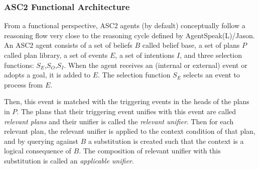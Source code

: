 \subsubsection*{ASC2 Functional Architecture}
From a functional perspective, ASC2 agents (by default) conceptually follow a reasoning flow very close to the reasoning cycle defined by AgentSpeak(L)/Jason. An ASC2 agent consists of a set of beliefs $B$ called belief base, a set of plans $P$ called plan library, a set of events $E$, a set of intentions $I$, and three selection functions: $S_E$,$S_O$,$S_I$. When the agent receives an (internal or external) event or adopts a goal, it is added to $E$. The selection function $S_E$ selects an event to process from $E$.


Then, this event is matched with the triggering events in the heads of the plans in $P$. The plans that their triggering event unifies with this event are called \textit{relevant plans} and their unifier is called the \textit{relevant unifier}. Then for each relevant plan, the relevant unifier is applied to the context condition of that plan, and by querying against $B$ a substitution is created such that the context is a logical consequence of $B$. The composition of relevant unifier with this substitution is called an \textit{applicable unifier}. 




